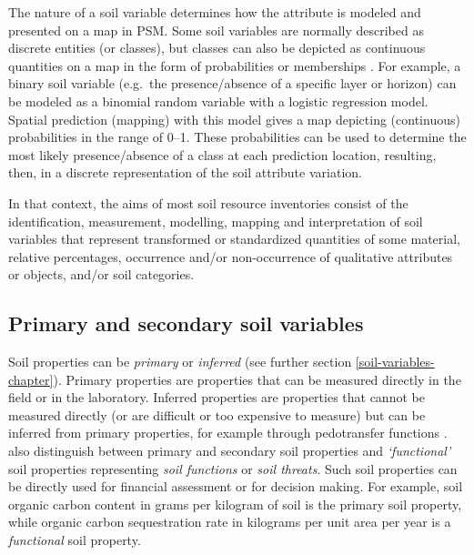 \documentclass[graybox,natbib,nospthms,UStrade]{svmono}
\begin{document}
The nature of a soil variable determines how the attribute is modeled
and presented on a map in PSM. Some soil variables are
normally described as discrete entities (or classes), but classes can also be
depicted as continuous quantities on a map in the form of
probabilities or memberships
\citep{DeGruijter1997Geoderma, McBratney2003Geoderma, Kempen2009Geoderma, Odgers201130}.
For example, a binary soil variable (e.g.~the presence/absence of a
specific layer or horizon) can be modeled as a binomial random variable
with a logistic regression model. Spatial prediction (mapping) with this
model gives a map depicting (continuous) probabilities in the range of
0--1. These probabilities can be used to determine the most likely presence/absence
of a class at each prediction location, resulting, then, in a discrete
representation of the soil attribute variation.

In that context, the aims of most soil resource inventories consist of the
identification, measurement, modelling, mapping and interpretation of
soil variables that represent transformed or standardized quantities of
some material, relative percentages, occurrence and/or non-occurrence of
qualitative attributes or objects, and/or soil categories.

\hypertarget{primary-and-secondary-soil-variables}{%
\subsection{Primary and secondary soil variables}\label{primary-and-secondary-soil-variables}}

Soil properties can be \emph{primary} or \emph{inferred} (see further section \ref{soil-variables-chapter}).
Primary properties are properties that can be measured directly in the
field or in the laboratory. Inferred properties are properties that
cannot be measured directly (or are difficult or too expensive to
measure) but can be inferred from primary properties, for example through
pedotransfer functions \citep{Wosten2001JH, wosten2013soil}.
\citet{Dobos2006digital} also distinguish between primary and secondary soil
properties and \emph{`functional'} soil properties representing \emph{soil
functions} or \emph{soil threats}. Such soil properties can be directly used
for financial assessment or for decision making. For example, soil
organic carbon content in grams per kilogram of soil is the primary soil
property, while organic carbon sequestration rate in kilograms per unit
area per year is a \emph{functional} soil property.
\end{document}
